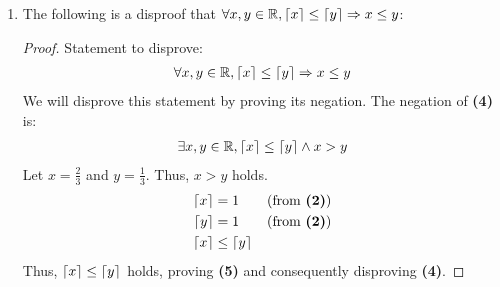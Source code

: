 \documentclass[12pt]{article}
\theoremstyle{definition}
\begin{document}
\begin{enumerate}
\begin{enumerate}[i]
\begin{proof}
                From \textbf{(2)}, we know the following:
                \begin{align*}
                    x \leq \ceil{x} &< x + 1\\
                    &\leq y + 1 \tag{using our assumption $x \leq y$}
                \end{align*}
                Thus, $\ceil{x} < y $.
                
                Similarly, from \textbf{(2)} we also know that $y \leq \ceil{y}$. Thus,  $y + 1 \leq \ceil{y} + 1$.
                \begin{align*}
                    \ceil{x} &< y + 1 \leq \ceil{y} + 1\\
                    \ceil{x} &< \ceil{y} + 1 \\
                    \leftrightarrow \ceil{x} &\leq \ceil{y}
                \end{align*}
                
            \end{proof}
            \item The following is a disproof that $\forall x, y \in \mathbb R, \lceil x \rceil \leq \lceil y \rceil \mathrel{\Rightarrow} x \leq y$:
            \begin{proof}
                Statement to disprove:
                \begin{align}
                    \forall x, y \in \mathbb R, \lceil x \rceil \leq \lceil y \rceil \mathrel{\Rightarrow} x \leq y
                \end{align}
                We will disprove this statement by proving its negation. The negation of \textbf{(4)} is:
                \begin{align}
                    \exists x, y \in \mathbb R, \left \lceil x \right \rceil \leq \left \lceil y \right \rceil \land x > y
                \end{align}
                Let $x = \frac{2}{3}$ and $y = \frac{1}{3}$. Thus, $x > y$ holds.
                \begin{align*}
                    \ceil{x} &= 1\tag{from \textbf{(2)}}\\
                    \ceil{y} &= 1\tag{from \textbf{(2)}}\\
                    \ceil{x} &\leq \ceil{y}
                \end{align*}
                Thus, $\left \lceil x \right \rceil \leq \left \lceil y \right \rceil$ holds, proving \textbf{(5)} and consequently disproving \textbf{(4)}.
            \end{proof}
        \end{enumerate}
\end{enumerate}
\end{document}
